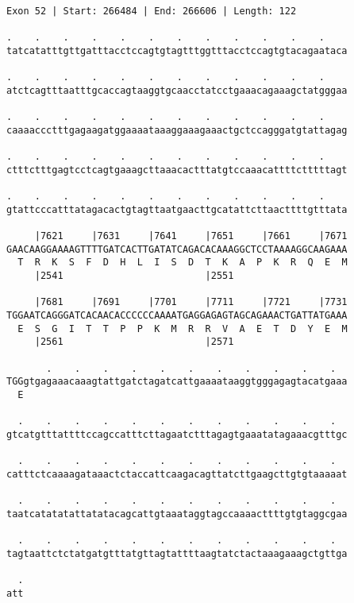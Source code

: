 \documentclass{article}
\begin{document}
\newpage
\begin{Verbatim}
Exon 52 | Start: 266484 | End: 266606 | Length: 122
 
.    .    .    .    .    .    .    .    .    .    .    .    
tatcatatttgttgatttacctccagtgtagtttggtttacctccagtgtacagaataca
  
.    .    .    .    .    .    .    .    .    .    .    .    
atctcagtttaatttgcaccagtaaggtgcaacctatcctgaaacagaaagctatgggaa
  
.    .    .    .    .    .    .    .    .    .    .    .    
caaaaccctttgagaagatggaaaataaaggaaagaaactgctccagggatgtattagag
  
.    .    .    .    .    .    .    .    .    .    .    .    
ctttctttgagtcctcagtgaaagcttaaacactttatgtccaaacattttctttttagt
  
.    .    .    .    .    .    .    .    .    .    .    .    
gtattcccatttatagacactgtagttaatgaacttgcatattcttaacttttgtttata
  
     |7621     |7631     |7641     |7651     |7661     |7671
GAACAAGGAAAAGTTTTGATCACTTGATATCAGACACAAAGGCTCCTAAAAGGCAAGAAA
  T  R  K  S  F  D  H  L  I  S  D  T  K  A  P  K  R  Q  E  M
     |2541                         |2551                    
  
     |7681     |7691     |7701     |7711     |7721     |7731
TGGAATCAGGGATCACAACACCCCCCAAAATGAGGAGAGTAGCAGAAACTGATTATGAAA
  E  S  G  I  T  T  P  P  K  M  R  R  V  A  E  T  D  Y  E  M
     |2561                         |2571                    
  
       .    .    .    .    .    .    .    .    .    .    .  
TGGgtgagaaacaaagtattgatctagatcattgaaaataaggtgggagagtacatgaaa
  E                                                         
  
  .    .    .    .    .    .    .    .    .    .    .    .  
gtcatgtttattttccagccatttcttagaatctttagagtgaaatatagaaacgtttgc
  
  .    .    .    .    .    .    .    .    .    .    .    .  
catttctcaaaagataaactctaccattcaagacagttatcttgaagcttgtgtaaaaat
  
  .    .    .    .    .    .    .    .    .    .    .    .  
taatcatatatattatatacagcattgtaaataggtagccaaaacttttgtgtaggcgaa
  
  .    .    .    .    .    .    .    .    .    .    .    .  
tagtaattctctatgatgtttatgttagtattttaagtatctactaaagaaagctgttga
  
  .
att
\end{Verbatim}
\newpage
\end{document}
